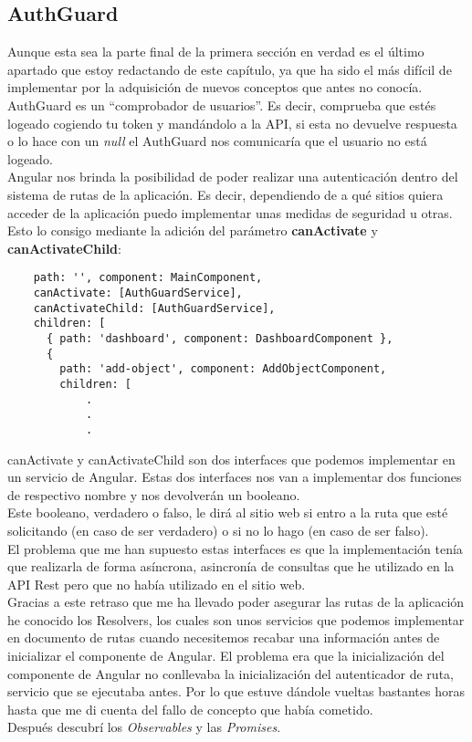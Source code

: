 \subsection{AuthGuard}
Aunque esta sea la parte final de la primera sección en verdad es el último apartado que estoy redactando de este capítulo, ya que ha sido el más difícil de implementar por la adquisición de nuevos conceptos que antes no conocía.
\\AuthGuard es un ``comprobador de usuarios''. Es decir, comprueba que estés logeado cogiendo tu token y mandándolo a la API, si esta no devuelve respuesta o lo hace con un \textit{null} el AuthGuard nos comunicaría que el usuario no está logeado.
\\Angular nos brinda la posibilidad de poder realizar una autenticación dentro del sistema de rutas de la aplicación. Es decir, dependiendo de a qué sitios quiera acceder de la aplicación puedo implementar unas medidas de seguridad u otras.
\\Esto lo consigo mediante la adición del parámetro \textbf{canActivate} y \textbf{canActivateChild}:
\begin{verbatim}
    path: '', component: MainComponent, 
    canActivate: [AuthGuardService],
    canActivateChild: [AuthGuardService],
    children: [
      { path: 'dashboard', component: DashboardComponent },
      {
        path: 'add-object', component: AddObjectComponent,
        children: [
            .
            .
            .
\end{verbatim}
canActivate y canActivateChild son dos interfaces que podemos implementar en un servicio de Angular. Estas dos interfaces nos van a implementar dos funciones de respectivo nombre y nos devolverán un booleano.
\\Este booleano, verdadero o falso, le dirá al sitio web si entro a la ruta que esté solicitando (en caso de ser verdadero) o si no lo hago (en caso de ser falso).
\\El problema que me han supuesto estas interfaces es que la implementación tenía que realizarla de forma asíncrona, asincronía de consultas que he utilizado en la API Rest pero que no había utilizado en el sitio web.
\\Gracias a este retraso que me ha llevado poder asegurar las rutas de la aplicación he conocido los Resolvers, los cuales son unos servicios que podemos implementar en documento de rutas cuando necesitemos recabar una información antes de inicializar el componente de Angular. El problema era que la inicialización del componente de Angular no conllevaba la inicialización del autenticador de ruta, servicio que se ejecutaba antes. Por lo que estuve dándole vueltas bastantes horas hasta que me di cuenta del fallo de concepto que había cometido.
\\Después descubrí los \textit{Observables} y las \textit{Promises}.


